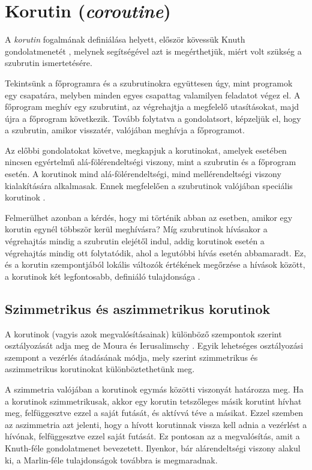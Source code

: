 \section{Korutin (\textit{coroutine})}

A \textit{korutin} fogalmának definiálása helyett, először kövessük Knuth gondolatmenetét \cite[p. 190]{TAoCPVol1}, melynek segítségével azt is megérthetjük, miért volt szükség a szubrutin ismertetésére.

Tekintsünk a főprogramra és a szubrutinokra együttesen úgy, mint programok egy csapatára, melyben minden egyes csapattag valamilyen feladatot végez el. A főprogram meghív egy szubrutint, az végrehajtja a megfelelő utasításokat, majd újra a főprogram következik. Tovább folytatva a gondolatsort, képzeljük el, hogy a szubrutin, amikor visszatér, valójában meghívja a főprogramot. 

Az előbbi gondolatokat követve, megkapjuk a korutinokat, amelyek esetében nincsen egyértelmű alá-fölérendeltségi viszony, mint a szubrutin és a főprogram esetén. A ko\-rutinok mind alá-fölérendeltségi, mind mellérendeltségi viszony kialakítására alkalmasak. Ennek megfelelően a szubrutinok valójában speciális korutinok \cite[p. 190]{TAoCPVol1}.

Felmerülhet azonban a kérdés, hogy mi történik abban az esetben, amikor egy korutin egynél többször kerül meghívásra? Míg szubrutinok hívásakor a végrehajtás mindig a szubrutin elejétől indul, addig korutinok esetén a végrehajtás mindig ott folytatódik, ahol a legutóbbi hívás esetén abbamaradt. Ez, és a korutin szempontjából lokális változók értékének megőrzése a hívások között, a korutinok két legfontosabb, definiáló tulajdonsága \cite{Marlin1980}.

\subsection{Szimmetrikus és aszimmetrikus korutinok}

A korutinok (vagyis azok megvalósításainak) különböző szempontok szerint osztályozását adja meg de Moura és Ierusalimschy \citeyear{RevisitingCoroutines}. Egyik lehetséges osztályozási szempont a vezérlés átadásának módja, mely szerint szimmetrikus és aszimmetrikus korutinokat különböztethetünk meg.

A szimmetria valójában a korutinok egymás közötti viszonyát határozza meg. Ha a korutinok szimmetrikusak, akkor egy korutin tetszőleges másik korutint hívhat meg, felfüggesztve ezzel a saját futását, és aktívvá téve a másikat. Ezzel szemben az aszimmetria azt jelenti, hogy a hívott korutinnak vissza kell adnia a vezérlést a hívónak, felfüggesztve ezzel saját futását. Ez pontosan az a megvalósítás, amit a Knuth-féle gondolatmenet bevezetett. Ilyenkor, bár alárendeltségi viszony alakul ki, a Marlin-féle tulajdonságok továbbra is megmaradnak.

